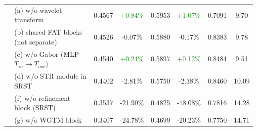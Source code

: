 \begin{table}[t]
{\begin{tabular}{l l cc cc cc}
 & (a) w/o wavelet transform & 0.4567 & \textcolor{ForestGreen}{+0.84\%} & 0.5953 & \textcolor{ForestGreen}{+1.07\%} & 0.7091 & 9.70 \\
 & (b) shared FAT blocks (not separate) & 0.4526 & \textcolor{BrickRed}{-0.07\%} & 0.5880 & \textcolor{BrickRed}{-0.17\%} & 0.8383 & 9.78 \\
 & (c) w/o Gabor (MLP $T_{in}\!\to\!T_{out}$) & 0.4540 & \textcolor{ForestGreen}{+0.24\%} & 0.5897 & \textcolor{ForestGreen}{+0.12\%} & 0.8484 & 9.51 \\
 & (d) w/o STR module in SRST & 0.4402 & \textcolor{BrickRed}{-2.81\%} & 0.5750 & \textcolor{BrickRed}{-2.38\%} & 0.8460 & 10.09 \\
 & (f) w/o refinement block (SRST) & 0.3537 & \textcolor{BrickRed}{-21.90\%} & 0.4825 & \textcolor{BrickRed}{-18.08\%} & 0.7816 & 14.28 \\
 & (g) w/o WGTM block & 0.3407 & \textcolor{BrickRed}{-24.78\%} & 0.4699 & \textcolor{BrickRed}{-20.23\%} & 0.7750 & 14.71 \\
\bottomrule
\end{tabular}}
\end{table}
